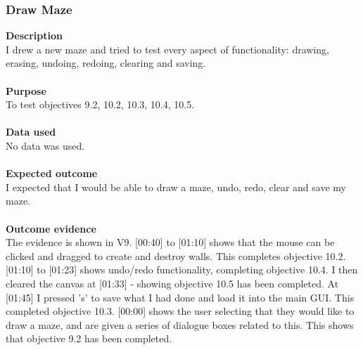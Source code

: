 \documentclass[titlepage]{article}
\begin{document}
\subsubsection{Draw Maze}
\textbf{Description}\\
I drew a new maze and tried to test every aspect of functionality: drawing, erasing, undoing, redoing, clearing and saving.\\\\
\textbf{Purpose}\\
To test objectives 9.2, 10.2, 10.3, 10.4, 10.5.\\\\
\textbf{Data used} \\
No data was used.\\\\
\textbf{Expected outcome}\\
I expected that I would be able to draw a maze, undo, redo, clear and save my maze.\\\\
\textbf{Outcome evidence}\\
The evidence is shown in V9. [00:40] to [01:10] shows that the mouse can be clicked and dragged to create and destroy walls. This completes objective 10.2. [01:10] to [01:23] shows undo/redo functionality, completing objective 10.4. I then cleared the canvas at [01:33] - showing objective 10.5 has been completed. At [01:45] I pressed 's' to save what I had done and load it into the main GUI. This completed objective 10.3. [00:00] shows the user selecting that they would like to draw a maze, and are given a series of dialogue boxes related to this. This shows that objective 9.2 has been completed.
\end{document}
